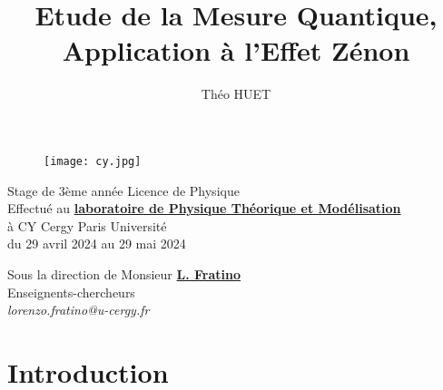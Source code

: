 \documentclass[11pt]{article}
\title{\textbf{Etude de la Mesure Quantique, Application à l'Effet Zénon}}
\author{Théo HUET}
\date{}
\begin{document}
\begin{figure}[h]
\texttt{[image: cy.jpg]}
\vspace{6cm}

\maketitle
\end{figure}
\thispagestyle{empty}
\vspace{8.6cm}

\centering
Stage de 3ème année Licence de Physique
\\
Effectué au \href{https://www.cyu.fr/recherche-et-valorisation/structures-de-recherche/laboratoires/laboratoire-de-physique-theorique-et-modelisation}{\textbf{laboratoire de Physique Théorique et Modélisation}}
\\
à CY Cergy Paris Université \\
du 29 avril 2024 au 29 mai 2024
\begin{center}
    Sous la direction de Monsieur \href{https://www.cyu.fr/lorenzo-fratino}{\textbf{L. Fratino}}
    \\
    Enseignents-chercheurs\\
    \textit{lorenzo.fratino@u-cergy.fr}
\end{center}




\newpage
\thispagestyle{empty}
\raggedright
\tableofcontents\text{}

\newpage

\setcounter{page}{1}
\section{Introduction}
\end{document}
